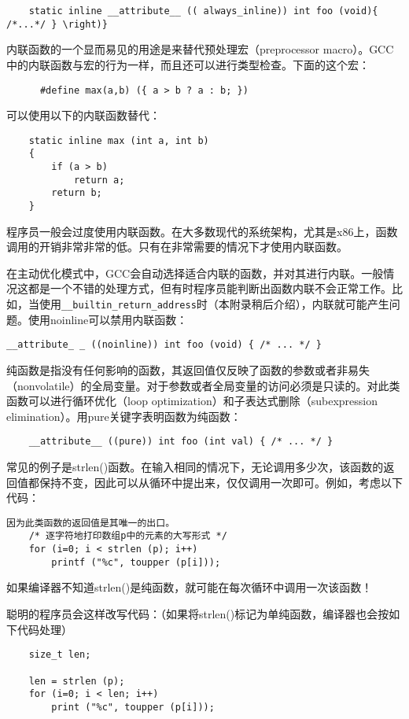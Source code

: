 \begin{lstlisting}
	static inline __attribute__ (( always_inline)) int foo (void){ /*...*/ } \right)}
\end{lstlisting}
内联函数的一个显而易见的用途是来替代预处理宏（preprocessor macro）。GCC中的内联函数与宏的行为一样，而且还可以进行类型检查。下面的这个宏：
\begin{lstlisting}
	  #define max(a,b) ({ a > b ? a : b; })
\end{lstlisting}
可以使用以下的内联函数替代：
\begin{lstlisting}
	static inline max (int a, int b)
	{
		if (a > b)
			return a;
		return b;
	}
\end{lstlisting}
程序员一般会过度使用内联函数。在大多数现代的系统架构，尤其是x86上，函数调用的开销非常非常的低。只有在非常需要的情况下才使用内联函数。

在主动优化模式中，GCC会自动选择适合内联的函数，并对其进行内联。一般情况这都是一个不错的处理方式，但有时程序员能判断出函数内联不会正常工作。比如，当使用\verb+__builtin_return_address+时（本附录稍后介绍），内联就可能产生问题。使用noinline可以禁用内联函数：
\begin{lstlisting}
__attribute_ _ ((noinline)) int foo (void) { /* ... */ }
\end{lstlisting}

纯函数是指没有任何影响的函数，其返回值仅反映了函数的参数或者非易失（nonvolatile）的全局变量。对于参数或者全局变量的访问必须是只读的。对此类函数可以进行循环优化（loop optimization）和子表达式删除（subexpression elimination）。用pure关键字表明函数为纯函数：
\begin{lstlisting}
    __attribute__ ((pure)) int foo (int val) { /* ... */ }
\end{lstlisting}

常见的例子是strlen()函数。在输入相同的情况下，无论调用多少次，该函数的返回值都保持不变，因此可以从循环中提出来，仅仅调用一次即可。例如，考虑以下代码：
\begin{lstlisting}因为此类函数的返回值是其唯一的出口。
    /* 逐字符地打印数组p中的元素的大写形式 */
    for (i=0; i < strlen (p); i++)
        printf ("%c", toupper (p[i]));
\end{lstlisting}

如果编译器不知道strlen()是纯函数，就可能在每次循环中调用一次该函数！

聪明的程序员会这样改写代码：（如果将strlen()标记为单纯函数，编译器也会按如下代码处理）
\begin{lstlisting}
    size_t len;
    
    len = strlen (p);
    for (i=0; i < len; i++)
        print ("%c", toupper (p[i]));
\end{lstlisting}


